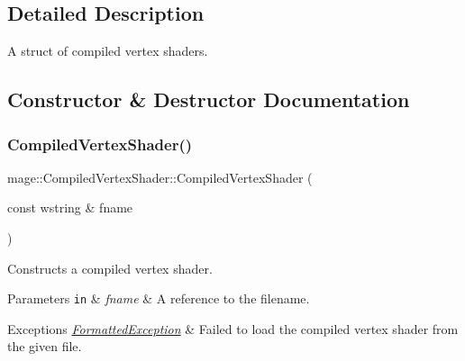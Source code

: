 \subsection{Detailed Description}
A struct of compiled vertex shaders. 

\subsection{Constructor \& Destructor Documentation}
\hypertarget{structmage_1_1_compiled_vertex_shader_a6d7c45d00130a68ee11beb1840d2756e}{}\label{structmage_1_1_compiled_vertex_shader_a6d7c45d00130a68ee11beb1840d2756e} 
\subsubsection{\texorpdfstring{Compiled\+Vertex\+Shader()}{CompiledVertexShader()}\hspace{0.1cm}{\footnotesize\ttfamily [1/4]}}
{\footnotesize\ttfamily mage\+::\+Compiled\+Vertex\+Shader\+::\+Compiled\+Vertex\+Shader (\begin{DoxyParamCaption}\item[{const wstring \&}]{fname }\end{DoxyParamCaption})\hspace{0.3cm}{\ttfamily [explicit]}}

Constructs a compiled vertex shader.


\begin{DoxyParams}[1]{Parameters}
\mbox{\tt in}  & {\em fname} & A reference to the filename. \\
\hline
\end{DoxyParams}

\begin{DoxyExceptions}{Exceptions}
{\em \hyperlink{structmage_1_1_formatted_exception}{Formatted\+Exception}} & Failed to load the compiled vertex shader from the given file. \\
\hline
\end{DoxyExceptions}
\hypertarget{structmage_1_1_compiled_vertex_shader_a1da7cb2d4355e1f7ed5c934774af3007}{}\label{structmage_1_1_compiled_vertex_shader_a1da7cb2d4355e1f7ed5c934774af3007} 
